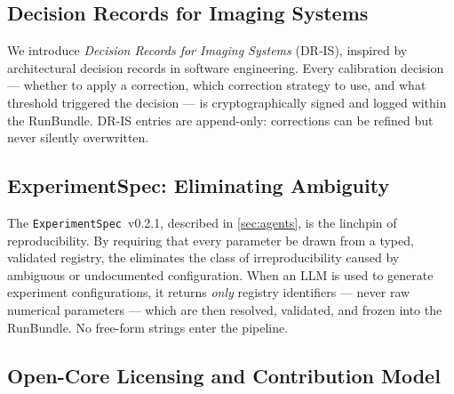 \subsection{Decision Records for Imaging Systems}

We introduce \emph{Decision Records for Imaging Systems} (DR-IS),
inspired by architectural decision records in software engineering.
Every calibration decision --- whether to apply a correction, which
correction strategy to use, and what threshold triggered the decision ---
is cryptographically signed and logged within the RunBundle.  DR-IS
entries are append-only: corrections can be refined but never silently
overwritten.

\subsection{ExperimentSpec: Eliminating Ambiguity}

The \texttt{ExperimentSpec}~v0.2.1, described in \cref{sec:agents}, is
the linchpin of reproducibility.  By requiring that every parameter be
drawn from a typed, validated registry, the \pwm{} eliminates the class
of irreproducibility caused by ambiguous or undocumented configuration.
When an LLM is used to generate experiment configurations, it returns
\emph{only} registry identifiers --- never raw numerical parameters ---
which are then resolved, validated, and frozen into the RunBundle.  No
free-form strings enter the pipeline.

\subsection{Open-Core Licensing and Contribution Model}


